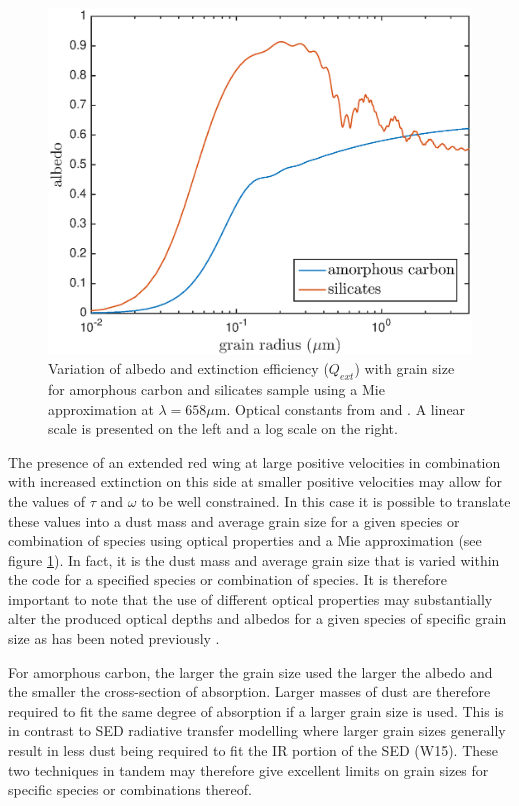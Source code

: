 \documentclass[useAMS,usenatbib,usegraphicx]{mnras}
\begin{document}
\begin{figure}
\begin{center}
\includegraphics[trim =37 10 45 15,clip=true,scale=0.51]{albedo_grainsize_upto4_log}
\caption{Variation of albedo and extinction efficiency ($Q_{ext}$) with grain size for amorphous carbon and silicates sample using a Mie approximation at $\lambda = 658 \mu $m. Optical constants from \citet{Zubko1996} and \citet{Draine1984}. A linear scale is presented on the left and a log scale on the right.}
\label{albedo_grain}
\end{center}
\end{figure}

The presence of an extended red wing at large positive velocities in combination with increased extinction on this side at smaller positive velocities may allow for the values of $\tau$ and $\omega$ to be well constrained.  In this case it is possible to translate these values into a dust mass and average grain size for a given species or combination of species using optical properties and a Mie approximation (see figure \ref{albedo_grain}).  In fact, it is the dust mass and average grain size that is varied within the code for a specified species or combination of species.  It is therefore important to note that the use of different optical properties may substantially alter the produced optical depths and albedos for a given species of specific grain size as has been noted previously \citep{Owen2015}.


For amorphous carbon, the larger the grain size used the larger the albedo and the smaller the cross-section of absorption.  Larger masses of dust are therefore required to fit the same degree of absorption if a larger grain size is used.  This is in contrast to SED radiative transfer modelling where larger grain sizes generally result in less dust being required to fit the IR portion of the SED (W15).  These two techniques in tandem may therefore give excellent limits on grain sizes for specific species or combinations thereof.
\end{document}
